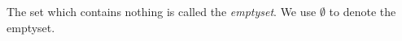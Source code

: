 \guard



\begin{defn}
\label{defn:emptyset}
\index{$\emptyset$}
  The set which contains nothing is called the \emph{emptyset}.
  We use $\emptyset$ to denote the emptyset.
\end{defn}
